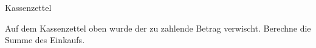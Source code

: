 \documentclass[12pt,a5paper,landscape]{scrartcl}
\begin{document}
	\begin{karte1}{Kassenzettel}
		
		Auf dem Kassenzettel oben wurde der zu zahlende Betrag verwischt. Berechne die Summe des Einkaufs.
		
	\end{karte1}

	\leereKarte
\end{document}
